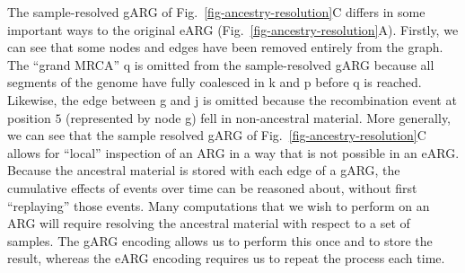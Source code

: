 \documentclass[9pt,twocolumn,twoside]{gsajnl}
\newcommand{\noderef}[1]{\textsf{#1}}
\begin{document}
The sample-resolved gARG of Fig.~\ref{fig-ancestry-resolution}C
differs in some important ways to the
original eARG (Fig.~\ref{fig-ancestry-resolution}A).
Firstly, we can see that some nodes and edges have been removed entirely
from the graph.
The ``grand MRCA'' \noderef{q} is omitted from the
sample-resolved gARG because all segments of the genome have
fully coalesced in \noderef{k} and \noderef{p} before \noderef{q} is reached.
Likewise, the edge
between \noderef{g} and \noderef{j} is omitted because the recombination
event at position $5$ (represented by node \noderef{g})
fell in non-ancestral material.
More generally, we can see that the sample resolved
gARG of Fig.~\ref{fig-ancestry-resolution}C
allows for ``local'' inspection
of an ARG in a way that is not possible in an eARG.
Because the ancestral material is stored with each edge of a gARG, the
cumulative effects of events over time can be reasoned
about, without first ``replaying'' those events.
Many computations
that we wish to perform on an ARG will require resolving
the ancestral material with respect to a set of samples.
The gARG encoding
allows us to perform this once
and to store the result,
whereas the eARG encoding requires us to repeat the process
each time.

\end{document}
